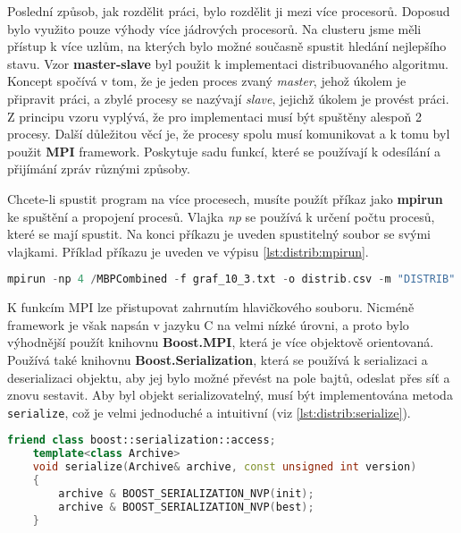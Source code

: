 Poslední způsob, jak rozdělit práci, bylo rozdělit ji mezi více procesorů.
Doposud bylo využito pouze výhody více jádrových procesorů.
Na clusteru jsme měli přístup k více uzlům, na kterých bylo možné současně spustit hledání nejlepšího stavu.
Vzor \textbf{master-slave} byl použit k implementaci distribuovaného algoritmu.
Koncept spočívá v tom, že je jeden proces zvaný \textit{master}, jehož úkolem je připravit práci, a zbylé procesy se nazývají \textit{slave}, jejichž úkolem je provést práci.
Z principu vzoru vyplývá, že pro implementaci musí být spuštěny alespoň 2 procesy.
Další důležitou věcí je, že procesy spolu musí komunikovat a k tomu byl použit \textbf{MPI} framework.
Poskytuje sadu funkcí, které se používají k odesílání a přijímání zpráv různými způsoby.

Chcete-li spustit program na více procesech, musíte použít příkaz jako \textbf{mpirun} ke spuštění a propojení procesů.
Vlajka \textit{np} se používá k určení počtu procesů, které se mají spustit.
Na konci příkazu je uveden spustitelný soubor se svými vlajkami.
Příklad příkazu je uveden ve výpisu \ref{lst:distrib:mpirun}.

\begin{lstlisting}[language=C++, label={lst:distrib:mpirun}, title={Příklad použití příkazu mpirun}]
mpirun -np 4 /MBPCombined -f graf_10_3.txt -o distrib.csv -m "DISTRIB" -dm 4 -ds 4 -t 3
\end{lstlisting}

K funkcím MPI lze přistupovat zahrnutím hlavičkového souboru.
Nicméně framework je však napsán v jazyku C na velmi nízké úrovni, a proto bylo výhodnější použít knihovnu \textbf{Boost.MPI}, která je více objektově orientovaná.
Používá také knihovnu \textbf{Boost.Serialization}, která se používá k serializaci a deserializaci objektu, aby jej bylo možné převést na pole bajtů, odeslat přes síť a znovu sestavit.
Aby byl objekt serializovatelný, musí být implementována metoda \texttt{serialize}, což je velmi jednoduché a intuitivní (viz \ref{lst:distrib:serialize}).

\begin{lstlisting}[language=C++, label={lst:distrib:serialize}, title={Příklad implementace metody serialize}]
    friend class boost::serialization::access;
    template<class Archive>
    void serialize(Archive& archive, const unsigned int version)
    {
        archive & BOOST_SERIALIZATION_NVP(init);
        archive & BOOST_SERIALIZATION_NVP(best);
    }
\end{lstlisting}


